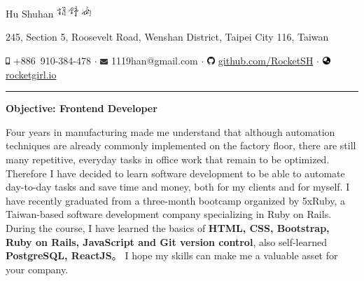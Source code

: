 \documentclass[a4paper,10pt]{article}
\begin{document}
\pagestyle{empty} %
\frenchspacing


\begin{center}
  \Huge{Hu Shuhan \includegraphics[height=1.2em,trim=0 10mm 0 -1cm]{shared/signature.png}}\par

\normalsize 245, Section 5, Roosevelt Road, Wenshan District, Taipei City 116, Taiwan 

  \includegraphics[height=0.7em]{shared/mobile-alt.eps} +886~910-384-478 $\cdot$
  \includegraphics[width=0.8em]{shared/envelope.eps} 1119han@gmail.com $\cdot$
  \includegraphics[width=0.8em]{shared/github.eps}
  \href{https://github.com/RocketSH}{github.com/RocketSH} $\cdot$
  \includegraphics[width=0.8em]{shared/globe-asia.eps} \href{https://rocketgirl.io/}{rocketgirl.io}

\rule{15.2cm}{0.05em}
\vspace*{1em}
\begin{center}
  \large{\textbf{Objective: Frontend Developer}}
\end{center}
\vspace*{1em}

\begin{center}
  \begin{minipage}{0.9\textwidth}
Four years in manufacturing made me understand that although automation techniques are already commonly
implemented on the factory floor, there are still many repetitive, everyday tasks in office work that remain to be optimized. Therefore I have decided to
learn software development to be able to automate day-to-day tasks and save time and money, both for my clients and for myself.
\vspace*{1em}
I have recently graduated from a three-month bootcamp organized by 5xRuby, a Taiwan-based
software development company specializing in Ruby on Rails.
During the course, I have learned the basics of \textbf{HTML, CSS, Bootstrap, Ruby on
          Rails, JavaScript and Git version control}, also self-learned
        \textbf{PostgreSQL, ReactJS}。
I hope my skills can make me a valuable asset for your company.
\end{minipage}
\end{center}




\end{center}
\end{document}
